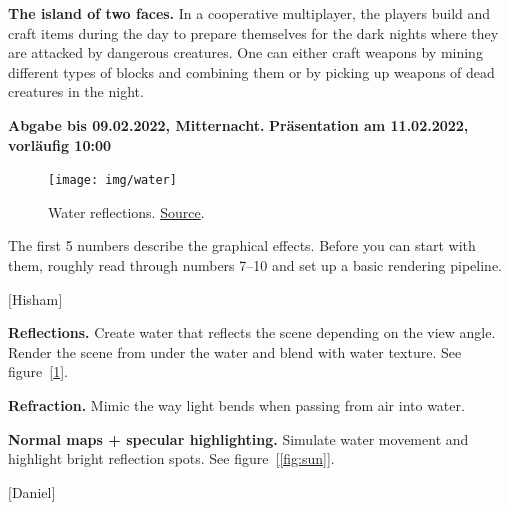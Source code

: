 \documentclass[A4paper]{gdv/gdv}
\newcommand{\teilaufgabe}[1]{\textbf{#1.}}
\begin{document}
\begin{gdvSheet}




\newcommand{\file}[1]{\texttt{#1}}
\newcommand{\code}[1]{\texttt{#1}}


\textbf{The island of two faces.}
In a cooperative multiplayer, the players build and craft items during the day to prepare themselves for the dark nights where they are attacked by dangerous creatures.
One can either craft weapons by mining different types of blocks and combining them or by picking up weapons of dead creatures in the night.

\textbf{Abgabe bis 09.02.2022, Mitternacht.}
\textbf{Präsentation am 11.02.2022, vorläufig 10:00}

\vspace*{32px}

\begin{figure}[ht]
	\centering
	\texttt{[image: img/water]}
	\caption{Water reflections. \href{https://www.reddit.com/r/Optifine/comments/krr89r/minecraft_can_be_beautiful_with_the_right_shaders/}{Source}.}\label{fig:water}
\end{figure}

\vspace*{12px}

\underline{}

The first 5 numbers describe the graphical effects.
Before you can start with them, roughly read through numbers 7--10 and set up a basic rendering pipeline.

$[$Hisham$]$

\teilaufgabe{Reflections}
Create water that reflects the scene depending on the view angle.
Render the scene from under the water and blend with water texture.
See figure~[\ref{fig:water}].

\teilaufgabe{Refraction}
Mimic the way light bends when passing from air into water.

\teilaufgabe{Normal maps + specular highlighting}
Simulate water movement and highlight bright reflection spots.
See figure~[\ref{fig:sun}].

$[$Daniel$]$


\end{gdvSheet}
\end{document}
